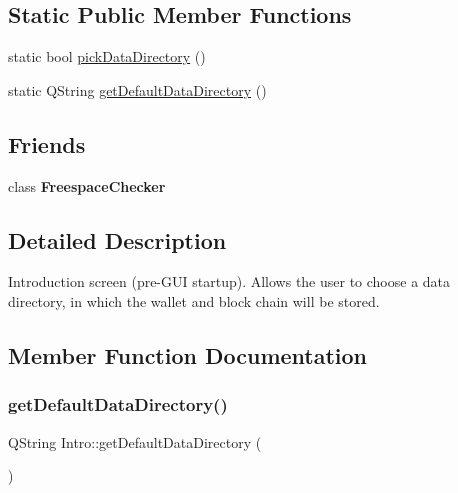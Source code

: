 \subsection*{Static Public Member Functions}
\begin{DoxyCompactItemize}
\item 
static bool \mbox{\hyperlink{class_intro_a3e0e541cd0e55fe71484055964925cfc}{pick\+Data\+Directory}} ()
\item 
static Q\+String \mbox{\hyperlink{class_intro_aad225845533fc7f451648dc7c9643e6a}{get\+Default\+Data\+Directory}} ()
\end{DoxyCompactItemize}
\subsection*{Friends}
\begin{DoxyCompactItemize}
\item 
\mbox{\label{class_intro_a79efd513440e3e26be2203f570653407}} 
class {\bfseries Freespace\+Checker}
\end{DoxyCompactItemize}


\subsection{Detailed Description}
Introduction screen (pre-\/\+G\+UI startup). Allows the user to choose a data directory, in which the wallet and block chain will be stored. 

\subsection{Member Function Documentation}
\mbox{\label{class_intro_aad225845533fc7f451648dc7c9643e6a}} 
\subsubsection{\texorpdfstring{get\+Default\+Data\+Directory()}{getDefaultDataDirectory()}}
{\footnotesize\ttfamily Q\+String Intro\+::get\+Default\+Data\+Directory (\begin{DoxyParamCaption}{ }\end{DoxyParamCaption})\hspace{0.3cm}{\ttfamily [static]}}

